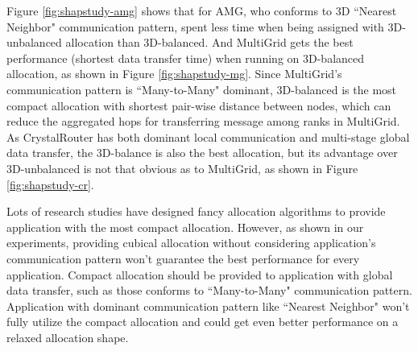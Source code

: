 \documentclass[conference]{IEEEtran}
\begin{document}
Figure \ref{fig:shapstudy-amg} shows that for AMG, who conforms to 3D ``Nearest Neighbor" communication pattern, spent less time when being assigned with 3D-unbalanced allocation than 3D-balanced. And MultiGrid gets the best performance (shortest data transfer time) when running on 3D-balanced allocation, as shown in Figure \ref{fig:shapstudy-mg}. Since MultiGrid's communication pattern is ``Many-to-Many" dominant, 3D-balanced is the most compact allocation with shortest pair-wise distance between nodes, which can reduce the aggregated hops for transferring message among ranks in MultiGrid. As CrystalRouter has both dominant local communication and multi-stage global data transfer, the 3D-balance is also the best allocation, but its advantage over 3D-unbalanced is not that obvious as to MultiGrid, as shown in Figure \ref{fig:shapstudy-cr}.

Lots of research studies have designed fancy allocation algorithms to provide application with the most compact allocation\cite{leung,LO}. However, as shown in our experiments, providing cubical allocation without considering application's communication pattern won't guarantee the best performance for every application. Compact allocation should be provided to application with global data transfer, such as those conforms to ``Many-to-Many" communication pattern. Application with dominant communication pattern like ``Nearest Neighbor" won't fully utilize the compact allocation and could get even better performance on a relaxed allocation shape. 
\end{document}
